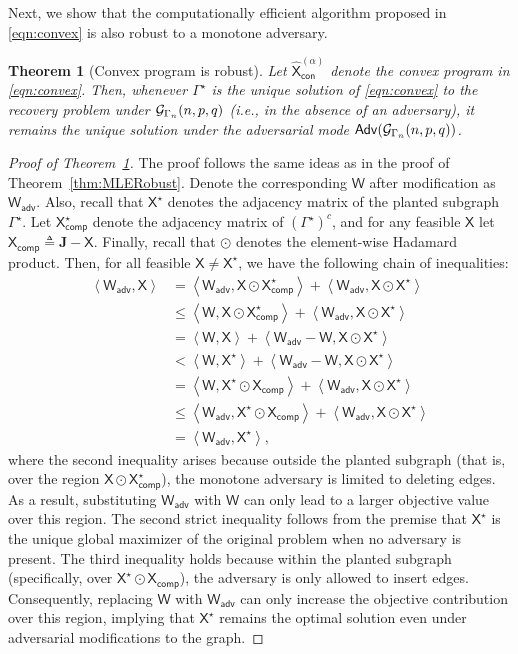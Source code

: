 \documentclass[12pt]{article}
\newtheorem{theorem}{Theorem}
\newcommand{\calG}{{\cal G}}
\newcommand{\innerP}[1]{\left\langle#1\right\rangle}
\newcommand{\s}[1]{\mathsf{#1}}
\begin{document}
Next, we show that the computationally efficient algorithm proposed in \eqref{eqn:convex} is also robust to a monotone adversary. 
\begin{theorem}[Convex program is robust]\label{thm:ConvRobust}
        Let $\hat{\s{X}}^{(\alpha)}_{\s{con}}$ denote the convex program in \eqref{eqn:convex}. Then, whenever $\Gamma^\star$ is the unique solution of \eqref{eqn:convex} to the recovery problem under $\calG_{\Gamma_n}(n,p,q)$ (i.e., in the absence of an adversary), it remains the unique solution under the adversarial mode $\s{Adv}(\calG_{\Gamma_n}(n,p,q))$.
\end{theorem}
\begin{proof}[Proof of Theorem~\ref{thm:ConvRobust}]
    The proof follows the same ideas as in the proof of Theorem~\ref{thm:MLERobust}. Denote the corresponding $\s{W}$ after modification as $\s{W}_{\s{adv}}$. Also, recall that $\s{X}^\star$ denotes the adjacency matrix of the planted subgraph $\Gamma^\star$. Let $\s{X}^\star_{\s{comp}}$ denote the adjacency matrix of $(\Gamma^\star)^c$, and for any feasible $\s{X}$ let $\s{X}_{\s{comp}}\triangleq\mathbf{J}-\s{X}$. Finally, recall that $\odot$ denotes the element-wise Hadamard product. Then, for all feasible $\s{X}\neq\s{X}^\star$, we have the following chain of inequalities:
    \begin{align}
        \innerP{\s{W}_{\s{adv}},\s{X}} &= \innerP{\s{W}_{\s{adv}},\s{X}\odot\s{X}^\star_{\s{comp}}}+\innerP{\s{W}_{\s{adv}},\s{X}\odot\s{X}^\star}\\
        &\leq\innerP{\s{W},\s{X}\odot\s{X}^\star_{\s{comp}}}+\innerP{\s{W}_{\s{adv}},\s{X}\odot\s{X}^\star}\\
        & = \innerP{\s{W},\s{X}}+\innerP{\s{W}_{\s{adv}}-\s{W},\s{X}\odot\s{X}^\star}\\
        &<\innerP{\s{W},\s{X}^\star}+\innerP{\s{W}_{\s{adv}}-\s{W},\s{X}\odot\s{X}^\star}\\
        & = \innerP{\s{W},\s{X}^\star\odot\s{X}_{\s{comp}}}+\innerP{\s{W}_{\s{adv}},\s{X}\odot\s{X}^\star}\\
        & \leq  \innerP{\s{W}_{\s{adv}},\s{X}^\star\odot\s{X}_{\s{comp}}}+\innerP{\s{W}_{\s{adv}},\s{X}\odot\s{X}^\star}\\
        & = \innerP{\s{W}_{\s{adv}},\s{X}^\star},
    \end{align}
    where the second inequality arises because outside the planted subgraph (that is, over the region $\s{X} \odot \s{X}^\star_{\s{comp}}$), the monotone adversary is limited to deleting edges. As a result, substituting $\s{W}_{\s{adv}}$ with $\s{W}$ can only lead to a larger objective value over this region. The second strict inequality follows from the premise that $\s{X}^\star$ is the unique global maximizer of the original problem when no adversary is present. The third inequality holds because within the planted subgraph (specifically, over $\s{X}^\star \odot \s{X}_{\s{comp}}$), the adversary is only allowed to insert edges. Consequently, replacing $\s{W}$ with $\s{W}_{\s{adv}}$ can only increase the objective contribution over this region, implying that $\s{X}^\star$ remains the optimal solution even under adversarial modifications to the graph.
\end{proof}
\end{document}
